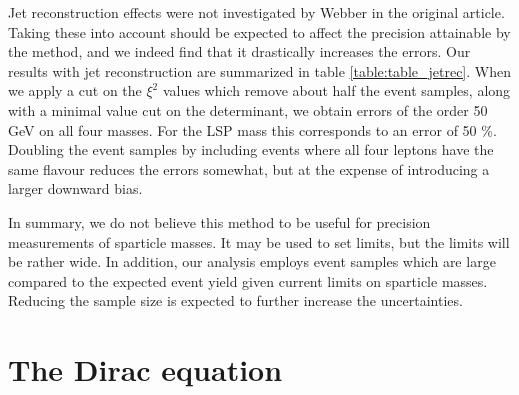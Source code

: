\documentclass[twoside,english]{uiofysmaster}
\begin{document}
Jet reconstruction effects were not investigated by Webber in the original article. Taking these into account should be expected to affect the precision attainable by the method, and we indeed find that it drastically increases the errors. Our results with jet reconstruction are summarized in table \ref{table:table_jetrec}. When we apply a cut on the $\xi^2$ values which remove about half the event samples, along with a minimal value cut on the determinant, we obtain errors of the order 50 GeV on all four masses. For the LSP mass this corresponds to an error of 50 \%. Doubling the event samples by including events where all four leptons have the same flavour reduces the errors somewhat, but at the expense of introducing a larger downward bias. 

In summary, we do not believe this method to be useful for precision measurements of sparticle masses. It may be used to set limits, but the limits will be rather wide. In addition, our analysis employs event samples which are large compared to the expected event yield given current limits on sparticle masses. Reducing the sample size is expected to further increase the uncertainties. 









































\appendix




\chapter{The Dirac equation}
\label{appendix:diraceq}
\end{document}
